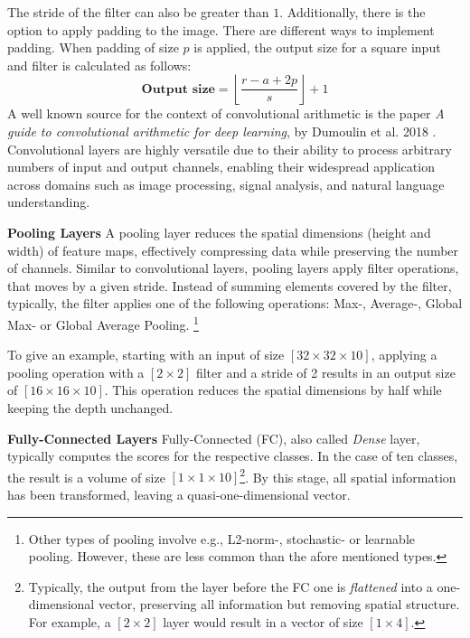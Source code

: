 The stride of the filter can also be greater than $1$. Additionally, there is the option to apply padding to the image. There are different ways to implement padding. When padding of size $p$ is applied, the output size for a square input and filter is calculated as follows:
\[
\textbf{Output size} = \left\lfloor \frac{r - a + 2p}{s} \right\rfloor + 1
\]
A well known source for the context of convolutional arithmetic is the paper \textit{A guide to convolutional arithmetic for deep learning}, by Dumoulin et al. 2018 \cite{Dumoulin2016TransposedConv}. Convolutional layers are highly versatile due to their ability to process arbitrary numbers of input and output channels, enabling their widespread application across domains such as image processing, signal analysis, and natural language understanding.

\vspace{1em}

\textbf{Pooling Layers}\label{theoretical_classification_pooling_layers}
A pooling layer reduces the spatial dimensions (height and width) of feature maps, effectively compressing data while preserving the number of channels. Similar to convolutional layers, pooling layers apply filter operations, that moves by a given stride. Instead of summing elements covered by the filter, typically, the filter applies one of the following operations: Max-, Average-, Global Max- or Global Average Pooling. \footnote{Other types of pooling involve e.g., L2-norm-, stochastic- or learnable pooling. However, these are less common than the afore mentioned types.}

To give an example, starting with an input of size $[32 \times 32 \times 10]$, applying a pooling operation with a $[2 \times 2]$ filter and a stride of 2 results in an output size of $[16 \times 16 \times 10]$. This operation reduces the spatial dimensions by half while keeping the depth unchanged.

\vspace{1em}

\textbf{Fully-Connected Layers}\label{theoretical_classification_fully_connected_layers}
Fully-Connected (FC), also called \textit{Dense} layer, typically computes the scores for the respective classes. In the case of ten classes, the result is a volume of size $[1 \times 1 \times 10]$\footnote{Typically, the output from the layer before the FC one is \textit{flattened} into a one-dimensional vector, preserving all information but removing spatial structure. For example, a $[2 \times 2]$ layer would result in a vector of size $[1 \times 4]$.}. By this stage, all spatial information has been transformed, leaving a quasi-one-dimensional vector.

